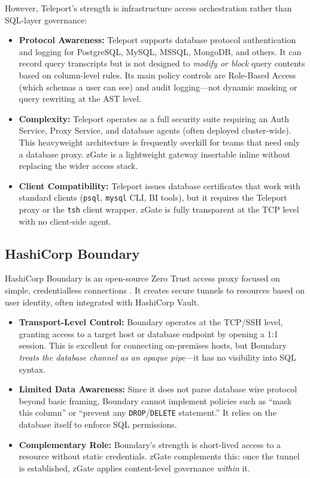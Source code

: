However, Teleport's strength is infrastructure access orchestration rather than SQL-layer governance:

\begin{itemize}
  \item \textbf{Protocol Awareness:} Teleport supports database protocol authentication and logging for PostgreSQL, MySQL, MSSQL, MongoDB, and others. It can record query transcripts but is not designed to \emph{modify or block} query contents based on column-level rules. Its main policy controls are Role-Based Access (which schemas a user can see) and audit logging---not dynamic masking or query rewriting at the AST level.
  \item \textbf{Complexity:} Teleport operates as a full security suite requiring an Auth Service, Proxy Service, and database agents (often deployed cluster-wide). This heavyweight architecture is frequently overkill for teams that need only a database proxy. zGate is a lightweight gateway insertable inline without replacing the wider access stack.
  \item \textbf{Client Compatibility:} Teleport issues database certificates that work with standard clients (\texttt{psql}, \texttt{mysql} CLI, BI tools), but it requires the Teleport proxy or the \texttt{tsh} client wrapper. zGate is fully transparent at the TCP level with no client-side agent.
\end{itemize}

\subsection{HashiCorp Boundary}

HashiCorp Boundary is an open-source Zero Trust access proxy focused on simple, credentialless connections \cite{vault}. It creates secure tunnels to resources based on user identity, often integrated with HashiCorp Vault.

\begin{itemize}
  \item \textbf{Transport-Level Control:} Boundary operates at the TCP/SSH level, granting access to a target host or database endpoint by opening a 1:1 session. This is excellent for connecting on-premises hosts, but Boundary \emph{treats the database channel as an opaque pipe}---it has no visibility into SQL syntax.
  \item \textbf{Limited Data Awareness:} Since it does not parse database wire protocol beyond basic framing, Boundary cannot implement policies such as ``mask this column'' or ``prevent any \texttt{DROP}/\texttt{DELETE} statement.'' It relies on the database itself to enforce SQL permissions.
  \item \textbf{Complementary Role:} Boundary's strength is short-lived access to a resource without static credentials. zGate complements this: once the tunnel is established, zGate applies content-level governance \emph{within} it.
\end{itemize}

